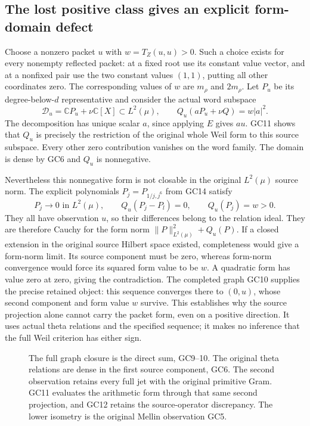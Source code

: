 \documentclass[11pt,a4paper]{article}
\theoremstyle{definition}\newtheorem{definition}[theorem]{Definition}
\newcommand{\C}{\mathbb C}\newcommand{\R}{\mathbb R}
\begin{document}
\subsection{The lost positive class gives an explicit form-domain defect}
Choose a nonzero packet $u$ with $w=T_Z(u,u)>0$. Such a choice
exists for every nonempty reflected packet: at a fixed root use
its constant value vector, and at a nonfixed pair use the two
constant values $(1,1)$, putting all other coordinates zero.
The corresponding values of $w$ are $m_\rho$ and $2m_\rho$.
Let $P_u$ be its degree-below-$d$ representative and consider
the actual word subspace
\[
 \mathcal D_u=\C P_u+\nu\C[X]\subset L^2(\mu),\qquad
 Q_u(aP_u+\nu Q)=w|a|^2.
 \tag{GC23}\label{gc:form-domain}
\]
The decomposition has unique scalar $a$, since applying $E$
gives $au$. GC11 shows that $Q_u$ is precisely the restriction
of the original whole Weil form to this source subspace.
Every other zero contribution vanishes on the word family.
The domain is dense by GC6 and $Q_u$ is nonnegative.

Nevertheless this nonnegative form is not closable in the
original $L^2(\mu)$ source norm. The explicit polynomials
$P_j=P_{1/j,j^6}$ from GC14 satisfy
\[
 P_j\longrightarrow0\text{ in }L^2(\mu),\qquad
 Q_u(P_j-P_l)=0,\qquad Q_u(P_j)=w>0.
 \tag{GC24}\label{gc:form-defect}
\]
They all have observation $u$, so their differences belong
to the relation ideal. They are therefore Cauchy for the
form norm $\|P\|_{L^2(\mu)}^2+Q_u(P)$. If a closed extension
in the original source Hilbert space existed, completeness
would give a form-norm limit. Its source component must be
zero, whereas form-norm convergence would force its squared
form value to be $w$. A quadratic form has value zero at zero,
giving the contradiction.
The completed graph GC10 supplies the precise retained object:
this sequence converges there to $(0,u)$, whose second component
and form value $w$ survive. This establishes why the source
projection alone cannot carry the packet form, even on a
positive direction. It uses actual theta relations and the
specified sequence; it makes no inference that the full
Weil criterion has either sign.

\begin{figure}[ht]
\centering
{}
\caption{The full graph closure is the direct sum, GC9--10.
The original theta relations are dense in the first source
component, GC6. The second observation retains every full jet
with the original primitive Gram. GC11 evaluates the arithmetic
form through that same second projection, and GC12 retains the
source-operator discrepancy. The lower isometry is the original
Mellin observation GC5.}
\end{figure}
\end{document}
